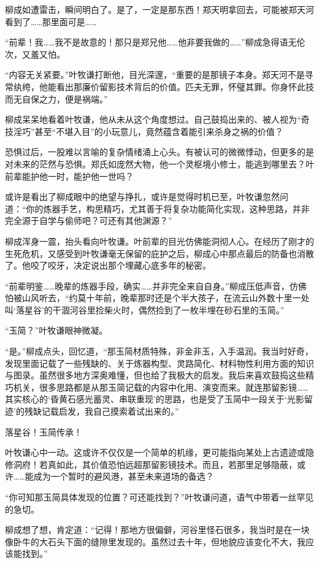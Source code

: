 柳成如遭雷击，瞬间明白了。是了，一定是那东西！郑天明拿回去，可能被郑天河看到了……那里面可是……

“前辈！我……我不是故意的！那只是郑兄他……他非要我做的……”柳成急得语无伦次，又羞又怕。

“内容无关紧要。”叶牧谦打断他，目光深邃，“重要的是那镜子本身。郑天河不是寻常纨绔，他能看出那廉价留影技术背后的价值。匹夫无罪，怀璧其罪。你身怀此技而无自保之力，便是祸端。”

柳成呆呆地看着叶牧谦，他从未从这个角度想过。自己鼓捣出来的、被人视为“奇技淫巧”甚至“不堪入目”的小玩意儿，竟然蕴含着能引来杀身之祸的价值？

恐惧过后，一股难以言喻的复杂情绪涌上心头。有被认可的微微悸动，但更多的是对未来的茫然与恐惧。郑氏如庞然大物，他一个灵枢境小修士，能逃到哪里去？叶前辈能护他一时，能护他一世吗？

或许是看出了柳成眼中的绝望与挣扎，或许是觉得时机已至，叶牧谦忽然问道：“你的炼器手艺，构思精巧，尤其善于将复杂功能简化实现，这种思路，并非完全源于自学与偷师吧？可还有其他渊源？”

柳成浑身一震，抬头看向叶牧谦。叶前辈的目光仿佛能洞彻人心。在经历了刚才的生死危机，又感受到叶牧谦毫无保留的庇护之后，柳成心中那点最后的防备也消散了。他咬了咬牙，决定说出那个埋藏心底多年的秘密。

“前辈明鉴……晚辈的炼器手段，确实……并非完全来自自身。”柳成压低声音，仿佛怕被山风听去，“约莫十年前，晚辈那时还是个半大孩子，在流云山外数十里一处叫‘落星谷’的干涸河谷里捡柴火时，偶然捡到了一枚半埋在砂石里的玉简。”

“玉简？”叶牧谦眼神微凝。

“是。”柳成点头，回忆道，“那玉简材质特殊，非金非玉，入手温润。我当时好奇，发现里面记载了一些残缺的、关于炼器构型、灵路简化、材料物性利用方面的知识与图录。虽然很多地方深奥难懂，但也给了我极大的启发。我后来喜欢鼓捣这些精巧机关，很多思路都是从那玉简记载的内容中化用、演变而来。就连那留影镜……其实核心的‘昏黄石感光蓄灵、串联重现’的思路，也是受了玉简中一段关于‘光影留迹’的残缺记载启发，我自己摸索着试出来的。”

落星谷！玉简传承！

叶牧谦心中一动。这或许不仅仅是一个简单的机缘，更可能指向某处上古遗迹或隐修洞府！若真如此，其价值恐怕远超那留影镜技术。而且，若那里足够隐蔽，或许……能成为一个暂时的避风港，甚至未来道场的备选？

“你可知那玉简具体发现的位置？可还能找到？”叶牧谦问道，语气中带着一丝罕见的急切。

柳成想了想，肯定道：“记得！那地方很偏僻，河谷里怪石很多，我当时是在一块像卧牛的大石头下面的缝隙里发现的。虽然过去十年，但地貌应该变化不大，我应该能找到。”

